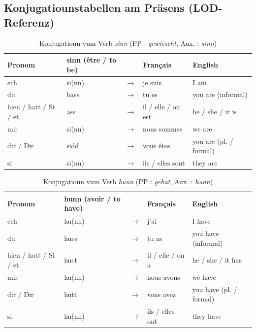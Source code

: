 \subsection{Konjugatiounstabellen am Präsens (LOD-Referenz)}

\begin{table}[htbp]
    \centering
    \begin{tabular}{ll c l l}
        \toprule
        \textbf{Pronom} & \textbf{sinn (être / to be)} & \textbf{} & \textbf{Français} & \textbf{English} \\
        \midrule
        ech & si(nn) & $\rightarrow$ & je suis & I am \\
        du & bass & $\rightarrow$ & tu es & you are (informal) \\
        hien / hatt / Si / et & ass & $\rightarrow$ & il / elle / on est & he / she / it is \\
        \midrule
        mir & si(nn) & $\rightarrow$ & nous sommes & we are \\
        dir / Dir & sidd & $\rightarrow$ & vous êtes & you are (pl. / formal) \\
        si & si(nn) & $\rightarrow$ & ils / elles sont & they are \\
        \bottomrule
    \end{tabular}
    \caption{Konjugatioun vum Verb \textit{sinn} (PP : \textit{gewiescht}, Aux. : \textit{sinn})}
\end{table}

\begin{table}[htbp]
    \centering
    \begin{tabular}{ll c l l}
        \toprule
        \textbf{Pronom} & \textbf{hunn (avoir / to have)} & \textbf{} & \textbf{Français} & \textbf{English} \\
        \midrule
        ech & hu(nn) & $\rightarrow$ & j'ai & I have \\
        du & hues & $\rightarrow$ & tu as & you have (informal) \\
        hien / hatt / Si / et & huet & $\rightarrow$ & il / elle / on a & he / she / it has \\
        \midrule
        mir & hu(nn) & $\rightarrow$ & nous avons & we have \\
        dir / Dir & hutt & $\rightarrow$ & vous avez & you have (pl. / formal) \\
        si & hu(nn) & $\rightarrow$ & ils / elles ont & they have \\
        \bottomrule
    \end{tabular}
    \caption{Konjugatioun vum Verb \textit{hunn} (PP : \textit{gehat}, Aux. : \textit{hunn})}
\end{table}

